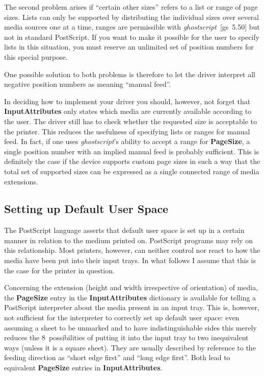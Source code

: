 \documentclass[twoside,a4paper]{article}
\newcommand{\gs}{\textit{ghostscript\/}}
\newcommand{\ps}[1]{{\sffamily\bfseries #1}}	%
\begin{document}
The second problem arises if ``certain other sizes'' refers to a list or range
of page sizes.
Lists can only be supported by distributing the individual sizes over several
media sources one at a time,
ranges are permissible with \gs~[gs~5.50] but not in standard PostScript.
If you want to make it possible for the user to specify lists in this
situation,
you must reserve an unlimited set of position numbers for this
special purpose.

One possible solution to both problems is therefore to let the driver interpret
all negative position numbers as meaning ``manual feed''.

In deciding how to implement your driver you should, however,
not forget that \ps{InputAttributes} only states which media are currently
available according to the user.
The driver still has to check whether the requested size is acceptable to the
printer.
This reduces the usefulness of specifying lists or ranges for manual feed.
In fact, if one uses \gs's ability to accept a range for \ps{PageSize},
a single position number with an implied manual feed is probably sufficient.
This is definitely the case if the device supports custom page sizes in such a
way that the total set of supported sizes can be expressed as a single
connected range of media extensions.


\subsection{Setting up Default User Space}	\label{PsUserSpace}

The PostScript language asserts that default user space is set up in a certain
manner in relation to the medium printed on.
PostScript programs may rely on this relationship.
Most printers, however, can neither control nor react to how the media have
been put into their input trays.
In what follows I assume that this is the case for the printer in question.

Concerning the extension (height and width irrespective of orientation) of
media,
the \ps{PageSize} entry in the \ps{InputAttributes} dictionary is available for
telling a PostScript interpreter about the media present in an input tray.
This is, however, not sufficient for the interpreter to correctly set up
default user space:
even assuming a sheet to be unmarked and to have indistinguishable sides
this merely reduces the 8~possibilities of putting it into the input tray to
two inequivalent ways (unless it is a square sheet).
They are usually described by reference to the feeding direction as
``short edge first'' and ``long edge first''.
Both lead to equivalent \ps{PageSize} entries in \ps{InputAttributes}.
\end{document}
